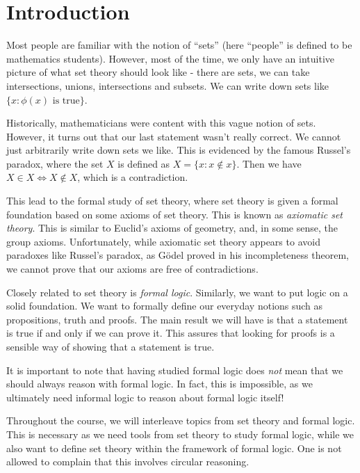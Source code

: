 \documentclass[a4paper]{article}
\begin{document}
\tableofcontents

\setcounter{section}{-1}
\section{Introduction}
Most people are familiar with the notion of ``sets'' (here ``people'' is defined to be mathematics students). However, most of the time, we only have an intuitive picture of what set theory should look like - there are sets, we can take intersections, unions, intersections and subsets. We can write down sets like $\{x: \phi(x)\text{ is true}\}$.

Historically, mathematicians were content with this vague notion of sets. However, it turns out that our last statement wasn't really correct. We cannot just arbitrarily write down sets we like. This is evidenced by the famous Russel's paradox, where the set $X$ is defined as $X = \{x: x\not \in x\}$. Then we have $X\in X \Leftrightarrow X\not\in X$, which is a contradiction.

This lead to the formal study of set theory, where set theory is given a formal foundation based on some axioms of set theory. This is known as \emph{axiomatic set theory}. This is similar to Euclid's axioms of geometry, and, in some sense, the group axioms. Unfortunately, while axiomatic set theory appears to avoid paradoxes like Russel's paradox, as G\"odel proved in his incompleteness theorem, we cannot prove that our axioms are free of contradictions.

Closely related to set theory is \emph{formal logic}. Similarly, we want to put logic on a solid foundation. We want to formally define our everyday notions such as propositions, truth and proofs. The main result we will have is that a statement is true if and only if we can prove it. This assures that looking for proofs is a sensible way of showing that a statement is true.

It is important to note that having studied formal logic does \emph{not} mean that we should always reason with formal logic. In fact, this is impossible, as we ultimately need informal logic to reason about formal logic itself!

Throughout the course, we will interleave topics from set theory and formal logic. This is necessary as we need tools from set theory to study formal logic, while we also want to define set theory within the framework of formal logic. One is not allowed to complain that this involves circular reasoning.
\end{document}
